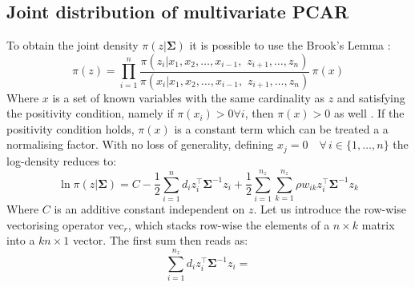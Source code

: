 \documentclass[openany, 11pt, oneside]{book}
\begin{document}
\begin{subappendices}
    

\section{Joint distribution of multivariate PCAR} \label{appendix:pcar}
To obtain the joint density $\pi(z \vert \boldsymbol{\Sigma})$ it is possible to use the Brook's Lemma \parencite{HammersleyClifford, CAR}:
 \begin{equation}
 \pi(z) = \prod_{i=1}^{n}  \frac{\pi \left(z_i \vert
 x_1, x_2, \dots, x_{i-1},\,\, z_{i+1}, \dots, z_n
 \right)}{\pi \left(x_i \vert
 x_1, x_2, \dots, x_{i-1},\,\, z_{i+1}, \dots, z_n
 \right)} \, \pi(x)
 \label{eq:brookslemma}
 \end{equation}
Where $x$ is a set of known variables with the same cardinality as $z$ and satisfying the positivity condition, namely if $\pi(x_i)>0 \forall i$, then $\pi(x)>0$ as well \parencite{CAR}. If the positivity condition holds,  $\pi(x)$ is a constant term which can be treated a a normalising factor. With no loss of generality, defining $x_j = 0 \quad \forall \, i \in \lbrace 1, \dots, n \rbrace$ the log-density reduces to:
%
$$
\ln \pi(z \vert \boldsymbol{\Sigma}) = C - \frac{1}{2}\sum_{i=1}^{n} d_i z_i ^{\top} \boldsymbol{\Sigma}^{-1} z_i +
\frac{1}{2}\sum_{i=1}^{n_z} \sum_{k=1}^{n_z}\rho w_{ik} z_i^{\top} \boldsymbol{\Sigma}^{-1} z_k
$$
%
Where $C$ is an additive constant independent on $z$. Let us introduce the row-wise vectorising operator $\mathrm{vec}_r$, which stacks row-wise the elements of a $n \times k$ matrix into a $kn \times 1$ vector. The first sum then reads as:
$$
 \sum_{i=1}^{n_z} d_i z^{\top}_i \boldsymbol{\Sigma}^{-1} z_i = 
$$
\end{subappendices}
\end{document}

